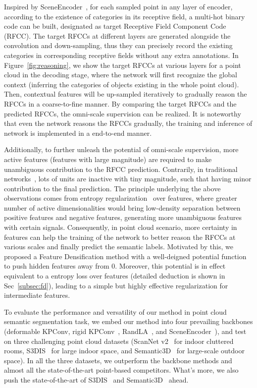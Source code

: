 \documentclass[final]{cvpr}
\begin{document}
Inspired by SceneEncoder~\cite{xu2020sceneencoder}, for each sampled point in any layer of encoder, according to the existence of categories in its receptive field, a multi-hot binary code can be built, designated as target Receptive Field Component Code (RFCC). The target RFCCs at different layers are generated alongside the convolution and down-sampling, thus they can precisely record the existing categories in corresponding receptive fields without any extra annotations. In Figure~\ref{fig:reasoning}, we show the target RFCCs at various layers for a point cloud in the decoding stage, where the network will first recognize the global context (inferring the categories of objects existing in the whole point cloud). Then, contextual features will be up-sampled iteratively to gradually reason the RFCCs in a coarse-to-fine manner. By comparing the target RFCCs and the predicted RFCCs, the omni-scale supervision can be realized. It is noteworthy that even the network reasons the RFCCs gradually, the training and inference of network is implemented in a end-to-end manner.








Additionally, to further unleash the potential of omni-scale supervision, more active features (features with large magnitude) are required to make unambiguous contribution to the RFCC prediction. Contrarily, in traditional networks~\cite{wu2019pointconv,thomas2019kpconv,xu2020sceneencoder}, lots of units are inactive with tiny magnitude, such that having minor contribution to the final prediction. The principle underlying the above observations comes from entropy regularization~\cite{grandvalet2005semi,lee2013pseudo} over features, where greater number of active dimensionalities would bring low-density separation between positive features and negative features, generating more unambiguous features with certain signals. Consequently, in point cloud scenario, more certainty in features can help the training of the network to better reason the RFCCs at various scales and finally predict the semantic labels. Motivated by this, we proposed a Feature Densification method with a well-deigned potential function to push hidden features away from $0$. Moreover, this potential is in effect equivalent to a entropy loss over features (detailed deduction is shown in Sec~\ref{subsec:fd}), leading to a simple but highly effective regularization for intermediate features.

To evaluate the performance and versatility of our method in point cloud semantic segmentation task, we embed our method into four prevailing backbones (deformable KPConv, rigid KPConv~\cite{thomas2019kpconv}, RandLA~\cite{hu2020randla}, and SceneEncoder~\cite{xu2020sceneencoder}), and test on three challenging point cloud datasets (ScanNet v2~\cite{dai2017scannet} for indoor cluttered rooms, S3DIS~\cite{armeni20163d} for large indoor space, and Semantic3D~\cite{hackel2017semantic3d} for large-scale outdoor space). In all the three datasets, we outperform the backbone methods and almost all the state-of-the-art point-based competitors. What's more, we also push the state-of-the-art of S3DIS~\cite{armeni20163d} and Semantic3D~\cite{hackel2017semantic3d} ahead.
\end{document}
